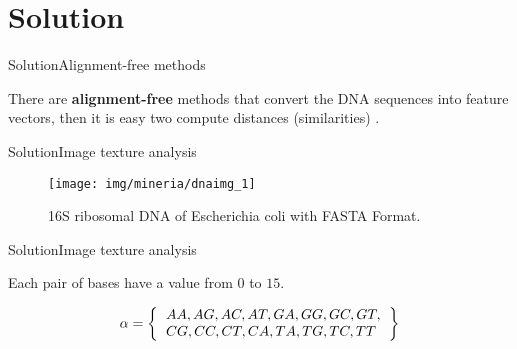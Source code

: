 \documentclass[10pt]{beamer}
\newcommand{\1}{
	\setbeamertemplate{background}{
		\texttt{[image: img/1\_dna]}
		\tikz[overlay] \fill[fill opacity=0.75,fill=white] (0,0) rectangle (-\paperwidth,\paperheight);
	}
}
\begin{document}
\section{Solution}

\begin{frame}{Solution}{Alignment-free methods}
	\begin{block}{}
		There are \textbf{alignment-free} methods that convert the DNA sequences into feature vectors, then it is easy two compute distances (similarities) \cite{delibacs2020dna}. 
	\end{block}
\end{frame}

\begin{frame}{Solution}{Image texture analysis}
	\begin{figure}[]
		\centering
		\texttt{[image: img/mineria/dnaimg\_1]}
		\label{img:mot2}
		\caption{16S ribosomal DNA of Escherichia coli with FASTA Format.}
	\end{figure}
\end{frame}

\begin{frame}{Solution}{Image texture analysis}
	\begin{block}{}
		Each pair of bases have a value from $0$ to $15$.
		
		\begin{equation}
			\alpha = \left\lbrace \begin{tabular}{l}
			$AA, AG, AC, AT, GA, GG, GC, GT,$\\
			$CG, CC, CT, CA, TA, TG, TC, TT$
			\end{tabular}      
			  \right\rbrace
		\end{equation}
		
	\end{block}
\end{frame}
\end{document}
